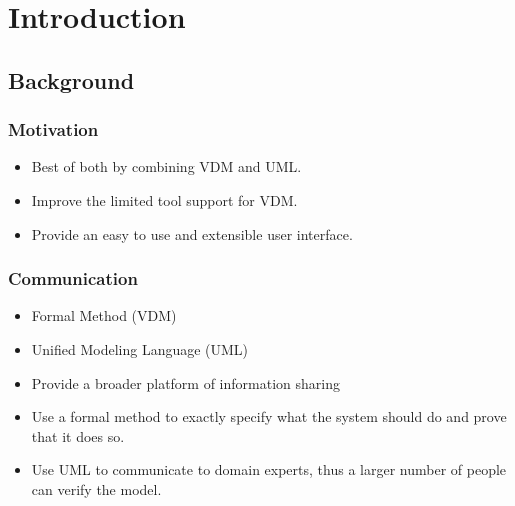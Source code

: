 %
%
\section{Introduction}

\subsection{Background}

%
%
\frame
{
 \frametitle{Motivation}
  \begin{itemize}[<+->]
\itemsep=1cm
  \item<1-> Best of both by combining VDM and UML.
  \item<2-> Improve the limited tool support for VDM.
  \item<3-> Provide an easy to use and extensible user interface.
  \end{itemize}
}

%
%
\frame
{
\frametitle{Communication}
  \begin{itemize}
	\itemsep=1cm
  		\item<1-> Formal Method (VDM)
  		\item<2-> Unified Modeling Language (UML)
  		\item<3-> Provide a broader platform of information sharing
  \end{itemize}

}

\note
{

  \begin{itemize}
  		\item Use a formal method to exactly specify what the system should do and prove that it does so.
  		\item Use UML to communicate to domain experts, thus a larger number of people can verify the model.
  		
  \end{itemize}



}

